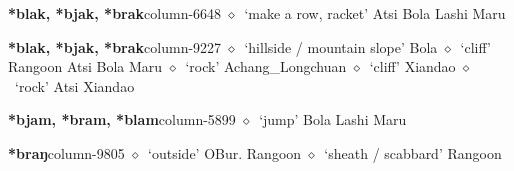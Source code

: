   \item {\footnotesize \textbf{*blak, *bjak, *brak}}{\tiny column-6648}
         $\diamond$~`make a row, racket'
         Atsi 
\hspace{1ex}
         Bola 
\hspace{1ex}
         Lashi 
\hspace{1ex}
         Maru 
  \item {\footnotesize \textbf{*blak, *bjak, *brak}}{\tiny column-9227}
         $\diamond$~`hillside / mountain slope'
         Bola 
\hspace{1ex}
         $\diamond$~`cliff'
         Rangoon 
\hspace{1ex}
         Atsi 
\hspace{1ex}
         Bola 
\hspace{1ex}
         Maru 
\hspace{1ex}
         $\diamond$~`rock'
         Achang\_Longchuan 
\hspace{1ex}
         $\diamond$~`cliff'
         Xiandao 
\hspace{1ex}
         $\diamond$~`rock'
         Atsi 
\hspace{1ex}
         Xiandao 
  \item {\footnotesize \textbf{*bjam, *bram, *blam}}{\tiny column-5899}
         $\diamond$~`jump'
         Bola 
\hspace{1ex}
         Lashi 
\hspace{1ex}
         Maru 
  \item {\footnotesize \textbf{*braŋ}}{\tiny column-9805}
         $\diamond$~`outside'
         OBur. 
\hspace{1ex}
         Rangoon 
\hspace{1ex}
         $\diamond$~`sheath / scabbard'
         Rangoon 
